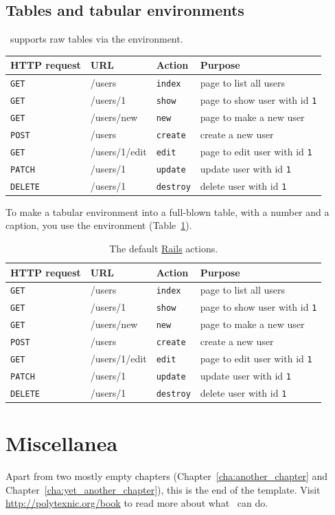 \subsection{Tables and tabular environments}
\label{tables_and_tabular}

\PolyTeXnic\ supports raw tables via the  environment.

\begin{tabular}{llll}
\textbf{HTTP request} & \textbf{URL} & \textbf{Action} & \textbf{Purpose} \\ \hline

\texttt{GET} & /users & \texttt{index} & page to list all users \\
\texttt{GET} & /users/1 & \texttt{show} & page to show user with id \texttt{1}\\
\texttt{GET} & /users/new & \texttt{new} & page to make a new user \\
\texttt{POST} & /users & \texttt{create} & create a new user \\
\texttt{GET} & /users/1/edit & \texttt{edit} & page to edit user with id \texttt{1} \\
\texttt{PATCH} & /users/1 & \texttt{update} & update user with id \texttt{1}  \\
\texttt{DELETE} & /users/1 & \texttt{destroy} & delete user with id \texttt{1}
\end{tabular}

To make a tabular environment into a full-blown table, with a number and a caption, you use the  environment (Table~\ref{table:rails_actions}).

\begin{table}
\begin{tabular}{llll}
\textbf{HTTP request} & \textbf{URL} & \textbf{Action} & \textbf{Purpose} \\ \hline

\texttt{GET} & /users & \texttt{index} & page to list all users \\
\texttt{GET} & /users/1 & \texttt{show} & page to show user with id \texttt{1}\\
\texttt{GET} & /users/new & \texttt{new} & page to make a new user \\
\texttt{POST} & /users & \texttt{create} & create a new user \\
\texttt{GET} & /users/1/edit & \texttt{edit} & page to edit user with id \texttt{1} \\
\texttt{PATCH} & /users/1 & \texttt{update} & update user with id \texttt{1}  \\
\texttt{DELETE} & /users/1 & \texttt{destroy} & delete user with id \texttt{1}
\end{tabular}
\caption{The default \href{http://rubyonrails.org/}{Rails} actions.\label{table:rails_actions}}
\end{table}

\section{Miscellanea}

Apart from two mostly empty chapters (Chapter~\ref{cha:another_chapter} and Chapter~\ref{cha:yet_another_chapter}), this is the end of the template. Visit \href{http://polytexnic.org/book}{http://polytexnic.org/book} to read more about what \PolyTeXnic\ can do.